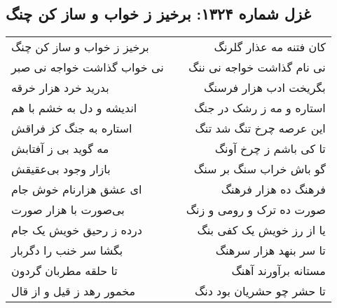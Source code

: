 \begin{center}
\section*{غزل شماره ۱۳۲۴: برخیز ز خواب و ساز کن چنگ}
\label{sec:1324}
\begin{longtable}{l p{0.5cm} r}
برخیز ز خواب و ساز کن چنگ
&&
کان فتنه مه عذار گلرنگ
\\
نی خواب گذاشت خواجه نی صبر
&&
نی نام گذاشت خواجه نی ننگ
\\
بدرید خرد هزار خرقه
&&
بگریخت ادب هزار فرسنگ
\\
اندیشه و دل به خشم با هم
&&
استاره و مه ز رشک در جنگ
\\
استاره به جنگ کز فراقش
&&
این عرصه چرخ تنگ شد تنگ
\\
مه گوید بی ز آفتابش
&&
تا کی باشم ز چرخ آونگ
\\
بازار وجود بی‌عقیقش
&&
گو باش خراب سنگ بر سنگ
\\
ای عشق هزارنام خوش جام
&&
فرهنگ ده هزار فرهنگ
\\
بی‌صورت با هزار صورت
&&
صورت ده ترک و رومی و زنگ
\\
درده ز رحیق خویش یک جام
&&
یا از رز خویش یک کفی بنگ
\\
بگشا سر خنب را دگربار
&&
تا سر بنهد هزار سرهنگ
\\
تا حلقه مطربان گردون
&&
مستانه برآورند آهنگ
\\
مخمور رهد ز قیل و از قال
&&
تا حشر چو حشریان بود دنگ
\\
\end{longtable}
\end{center}
